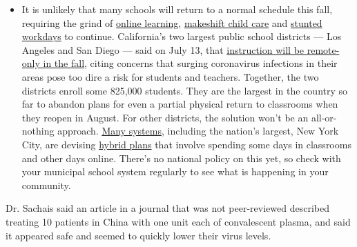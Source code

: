 \begin{itemize}
  \begin{itemize}
  \tightlist
  \item
    It is unlikely that many schools will return to a normal schedule
    this fall, requiring the grind of
    \href{https://www.nytimes3xbfgragh.onion/2020/06/05/us/coronavirus-education-lost-learning.html?action=click\&pgtype=Article\&state=default\&region=MAIN_CONTENT_3\&context=storylines_faq}{online
    learning},
    \href{https://www.nytimes3xbfgragh.onion/2020/05/29/us/coronavirus-child-care-centers.html?action=click\&pgtype=Article\&state=default\&region=MAIN_CONTENT_3\&context=storylines_faq}{makeshift
    child care} and
    \href{https://www.nytimes3xbfgragh.onion/2020/06/03/business/economy/coronavirus-working-women.html?action=click\&pgtype=Article\&state=default\&region=MAIN_CONTENT_3\&context=storylines_faq}{stunted
    workdays} to continue. California's two largest public school
    districts --- Los Angeles and San Diego --- said on July 13, that
    \href{https://www.nytimes3xbfgragh.onion/2020/07/13/us/lausd-san-diego-school-reopening.html?action=click\&pgtype=Article\&state=default\&region=MAIN_CONTENT_3\&context=storylines_faq}{instruction
    will be remote-only in the fall}, citing concerns that surging
    coronavirus infections in their areas pose too dire a risk for
    students and teachers. Together, the two districts enroll some
    825,000 students. They are the largest in the country so far to
    abandon plans for even a partial physical return to classrooms when
    they reopen in August. For other districts, the solution won't be an
    all-or-nothing approach.
    \href{https://bioethics.jhu.edu/research-and-outreach/projects/eschool-initiative/school-policy-tracker/}{Many
    systems}, including the nation's largest, New York City, are
    devising
    \href{https://www.nytimes3xbfgragh.onion/2020/06/26/us/coronavirus-schools-reopen-fall.html?action=click\&pgtype=Article\&state=default\&region=MAIN_CONTENT_3\&context=storylines_faq}{hybrid
    plans} that involve spending some days in classrooms and other days
    online. There's no national policy on this yet, so check with your
    municipal school system regularly to see what is happening in your
    community.
  \end{itemize}
\end{itemize}

Dr. Sachais said an article in a journal that was not peer-reviewed
described treating 10 patients in China with one unit each of
convalescent plasma, and said it appeared safe and seemed to quickly
lower their virus levels.


